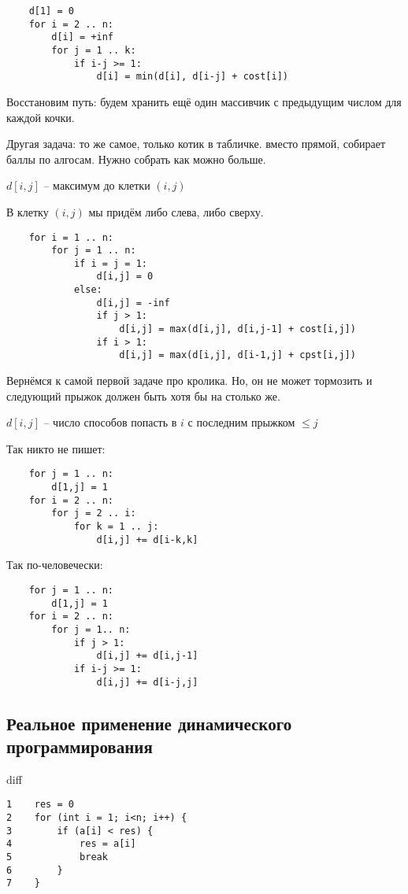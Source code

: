 \documentclass{book}
\theoremstyle{definition}
\begin{document}
\begin{verbatim}
    d[1] = 0
    for i = 2 .. n:
        d[i] = +inf
        for j = 1 .. k:
            if i-j >= 1:
                d[i] = min(d[i], d[i-j] + cost[i])
\end{verbatim}

Восстановим путь: будем хранить ещё один массивчик с предыдущим числом для каждой кочки.

Другая задача: то же самое, только котик в табличке. вместо прямой, собирает баллы по алгосам. Нужно собрать как можно больше.

$d[i,j]$ -- максимум до клетки  $(i,j)$

В клетку  $(i,j)$ мы придём либо слева, либо сверху.

\begin{verbatim}
    for i = 1 .. n:
        for j = 1 .. n:
            if i = j = 1:
                d[i,j] = 0
            else:
                d[i,j] = -inf
                if j > 1:
                    d[i,j] = max(d[i,j], d[i,j-1] + cost[i,j])
                if i > 1:
                    d[i,j] = max(d[i,j], d[i-1,j] + cpst[i,j])
\end{verbatim}

Вернёмся к самой первой задаче про кролика. Но, он не может тормозить и следующий прыжок должен быть хотя бы на столько же.

$d[i,j]$ -- число способов попасть в  $i$ с последним прыжком  $\leqslant j$

Так никто не пишет:

\begin{verbatim}
    for j = 1 .. n:
        d[1,j] = 1
    for i = 2 .. n:
        for j = 2 .. i:
            for k = 1 .. j:
                d[i,j] += d[i-k,k]
\end{verbatim}  

Так по-человечески:
\begin{verbatim}
    for j = 1 .. n:
        d[1,j] = 1
    for i = 2 .. n:
        for j = 1.. n:
            if j > 1:
                d[i,j] += d[i,j-1]
            if i-j >= 1:
                d[i,j] += d[i-j,j]
\end{verbatim}

\subsection{Реальное применение динамического программирования}

diff

\begin{verbatim}
1    res = 0
2    for (int i = 1; i<n; i++) {
3        if (a[i] < res) {
4            res = a[i]
5            break
6        }
7    }
\end{verbatim}
\end{document}
